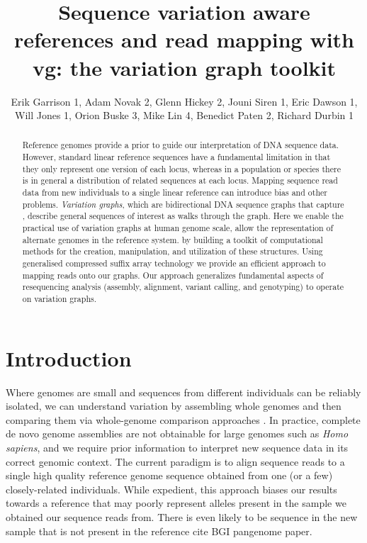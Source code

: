 \documentclass[12pt]{article}
\begin{document}
\title{Sequence variation aware references and read mapping with vg: the variation graph toolkit}

\author{Erik Garrison 1, Adam Novak 2, Glenn Hickey 2, Jouni Siren 1, Eric
  Dawson 1, Will Jones 1, Orion Buske 3, Mike Lin 4, Benedict Paten 2,
  Richard Durbin 1}

\maketitle

\begin{abstract}
Reference genomes provide a prior to guide our interpretation of DNA sequence data.
However, standard linear reference sequences have a fundamental limitation in that they only represent one version of each locus, whereas
in a population or species there is in general a distribution of related sequences at each locus.
Mapping sequence read data from new individuals to a single linear reference can introduce bias and other problems.
\emph{Variation graphs}, which are bidirectional DNA sequence graphs that capture , describe general sequences of interest as walks through the graph.
Here we enable the practical use of variation graphs at human genome scale, allow the representation of alternate genomes in the reference system.
by building a toolkit of computational methods for the creation, manipulation, and utilization of these structures.
Using generalised compressed suffix array technology we provide an efficient approach to mapping reads onto our graphs.
Our approach generalizes fundamental aspects of resequencing analysis (assembly, alignment, variant calling, and genotyping) to operate on variation graphs.
\end{abstract}

\section{Introduction}

Where genomes are small and sequences from different individuals can be reliably isolated, we can understand variation by assembling whole genomes and then comparing them via whole-genome comparison approaches \cite{mummer}.
In practice, complete de novo genome assemblies are not obtainable for large genomes such as \emph{Homo sapiens}, and we require prior information to interpret new sequence data in its correct genomic context.  
The current paradigm is to align sequence reads to a single high quality reference genome sequence obtained from one (or a few)  closely-related individuals.  
While expedient, this approach biases our results towards a reference that may poorly represent alleles present in the sample we obtained our sequence reads from.  
There is even likely to be sequence in the new sample that is not present in the reference {cite BGI pangenome paper}.  
\end{document}
